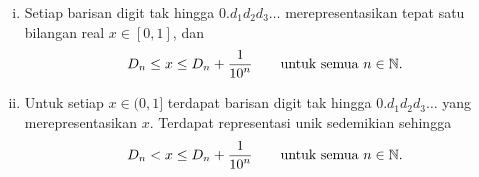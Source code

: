 \begin{prop} \label{prop:decimalprop}
\leavevmode
\begin{enumerate}[(i)]
\item
Setiap barisan digit tak hingga
$0.d_1d_2d_3\ldots$ merepresentasikan tepat satu bilangan real $x \in [0,1]$, dan
\begin{equation*}
D_n \leq x \leq D_n+\frac{1}{{10}^n} \qquad \text{untuk semua } n \in {\mathbb{N}}.
\end{equation*}
\item
Untuk setiap $x \in (0,1]$ terdapat barisan digit tak hingga
$0.d_1d_2d_3\ldots$ yang merepresentasikan $x$.
Terdapat representasi unik sedemikian sehingga
\begin{equation*}
D_n < x \leq D_n+\frac{1}{{10}^n} \qquad \text{untuk semua } n \in {\mathbb{N}}.
\end{equation*}
\end{enumerate}
\end{prop}

